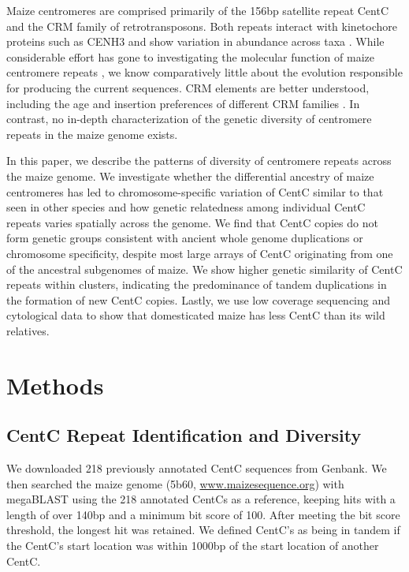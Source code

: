 Maize centromeres are comprised primarily of the 156bp satellite repeat CentC and the CRM family of retrotransposons.
Both repeats interact with kinetochore proteins such as CENH3 \citep{Wolfgruber2009, Zhong2002} and show variation in abundance across taxa \citep{Albert2010}.
While considerable effort has gone to investigating the molecular function of maize centromere repeats \citep{Ananiev1998B, Nagaki2003, Wolfgruber2009}, we know comparatively little about the evolution responsible for producing the current sequences. 
CRM elements are better understood, including the age and insertion preferences of different CRM families \citep{Wolfgruber2009, Sharma2008}.
In contrast, no in-depth characterization of the genetic diversity of centromere repeats in the maize genome exists.  

In this paper, we describe the patterns of diversity of centromere repeats across the maize genome.  
We investigate whether the differential ancestry of maize centromeres \citep{Wang2012} has led to chromosome-specific variation of CentC similar to that seen in other species \citep{Kawabe2005, Pontes2004} and how genetic relatedness among individual CentC repeats varies spatially across the genome.    
We find that CentC copies do not form genetic groups consistent with ancient whole genome duplications or chromosome specificity, despite most large arrays of CentC originating from  one of the ancestral subgenomes of maize.
We show higher genetic similarity of CentC repeats within clusters, indicating the predominance of tandem duplications in the formation of new CentC copies.
Lastly, we use low coverage sequencing and cytological data to show that domesticated maize has less CentC than its wild relatives.

\section*{Methods} 
\label{methods}

\subsection*{CentC Repeat Identification and Diversity}

We downloaded 218 previously annotated CentC sequences \citep{Ananiev1998B, Nagaki2003} from Genbank.  
We then searched the maize genome (5b60, \url{www.maizesequence.org}) with megaBLAST \citep{McGinnis2004} using the 218 annotated CentCs as a reference, keeping hits with a length of over 140bp and a minimum bit score of 100.
After meeting the bit score threshold, the longest hit was retained.
We defined CentC’s as being in tandem if the CentC’s start location was within 1000bp of the start location of another CentC.
	
